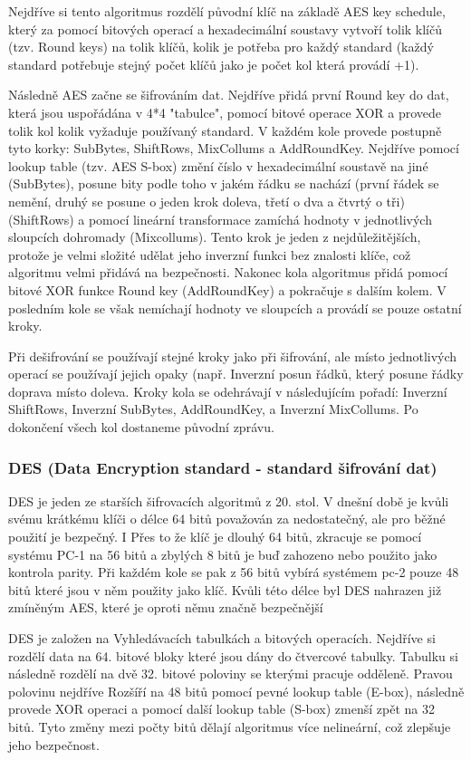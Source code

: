 \documentclass[12pt,a4paper]{report}
\begin{document}
Nejdříve si tento algoritmus rozdělí původní klíč na základě AES key schedule, který za pomocí bitových operací a hexadecimální soustavy vytvoří tolik klíčů (tzv. Round keys) na tolik klíčů, kolik je potřeba pro každý standard (každý standard potřebuje stejný počet klíčů jako je počet kol která provádí +1).

Následně AES začne se šifrováním dat. Nejdříve přidá první Round key do dat, která jsou uspořádána v 4*4 "tabulce", pomocí bitové operace XOR a provede tolik kol kolik vyžaduje používaný standard. V každém kole provede postupně tyto korky: SubBytes, ShiftRows, MixCollums a AddRoundKey. Nejdříve pomocí lookup table (tzv. AES S-box) změní číslo v hexadecimální soustavě na jiné (SubBytes), posune bity podle toho v jakém řádku se nachází (první řádek se nemění, druhý se posune o jeden krok doleva, třetí o dva a čtvrtý o tři) (ShiftRows) a pomocí lineární transformace zamíchá hodnoty v jednotlivých sloupcích dohromady (Mixcollums). Tento krok je jeden z nejdůležitějších, protože je velmi složité udělat jeho inverzní funkci bez znalosti klíče, což algoritmu velmi přidává na bezpečnosti. Nakonec kola algoritmus přidá pomocí bitové XOR funkce Round key (AddRoundKey) a pokračuje s dalším kolem. V posledním kole se však nemíchají hodnoty ve sloupcích a provádí se pouze ostatní kroky.

Při dešifrování se používají stejné kroky jako při šifrování, ale místo jednotlivých operací se používají jejich opaky (např. Inverzní posun řádků, který posune řádky doprava místo doleva. Kroky kola se odehrávají v následujícím pořadí: Inverzní ShiftRows, Inverzní SubBytes, AddRoundKey, a Inverzní MixCollums. Po dokončení všech kol dostaneme původní zprávu.

\subsubsection{DES (Data Encryption standard - standard šifrování dat)}
DES je jeden ze starších šifrovacích algoritmů z 20. stol. V dnešní době je kvůli svému krátkému klíči o délce 64 bitů považován za nedostatečný, ale pro běžné použití je bezpečný. I Přes to že klíč je dlouhý 64 bitů, zkracuje se pomocí systému PC-1 na 56 bitů a zbylých 8 bitů je buď zahozeno nebo použito jako kontrola parity. Při každém kole se pak z 56 bitů vybírá systémem pc-2 pouze 48 bitů které jsou v něm použity jako klíč. Kvůli této délce byl DES nahrazen již zmíněným AES, které je oproti němu značně bezpečnější

DES je založen na Vyhledávacích tabulkách a bitových operacích. Nejdříve si rozdělí data na 64. bitové bloky které jsou dány do čtvercové tabulky. Tabulku si následně rozdělí na dvě 32. bitové poloviny se kterými pracuje odděleně. Pravou polovinu nejdříve Rozšíří na 48 bitů pomocí pevné lookup table (E-box), následně provede XOR operaci a pomocí další lookup table (S-box) zmenší zpět na 32 bitů. Tyto změny mezi počty bitů dělají algoritmus více nelineární, což zlepšuje jeho bezpečnost.
\end{document}

